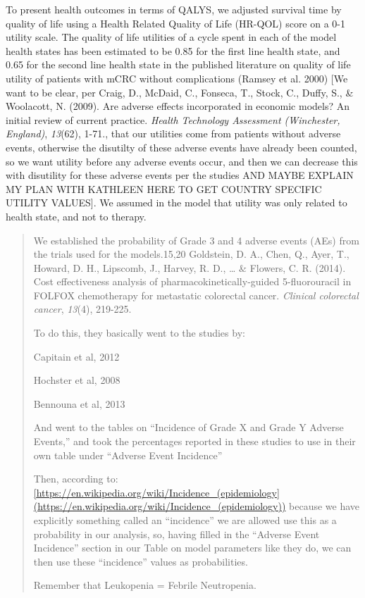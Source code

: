 \documentclass[
]{article}
\begin{document}
To present health outcomes in terms of QALYS, we adjusted survival time
by quality of life using a Health Related Quality of Life (HR-QOL) score
on a 0-1 utility scale. The quality of life utilities of a cycle spent
in each of the model health states has been estimated to be 0.85 for the
first line health state, and 0.65 for the second line health state in
the published literature on quality of life utility of patients with
mCRC without complications (Ramsey et al. 2000) {[}We want to be clear,
per Craig, D., McDaid, C., Fonseca, T., Stock, C., Duffy, S., \&
Woolacott, N. (2009). Are adverse effects incorporated in economic
models? An initial review of current practice. \emph{Health Technology
Assessment (Winchester, England)}, \emph{13}(62), 1-71., that our
utilities come from patients without adverse events, otherwise the
disutilty of these adverse events have already been counted, so we want
utility before any adverse events occur, and then we can decrease this
with disutility for these adverse events per the studies AND MAYBE
EXPLAIN MY PLAN WITH KATHLEEN HERE TO GET COUNTRY SPECIFIC UTILITY
VALUES{]}. We assumed in the model that utility was only related to
health state, and not to therapy.

\begin{quote}
We established the probability of Grade 3 and 4 adverse events (AEs)
from the trials used for the models.15,20 Goldstein, D. A., Chen, Q.,
Ayer, T., Howard, D. H., Lipscomb, J., Harvey, R. D., \ldots{} \&
Flowers, C. R. (2014). Cost effectiveness analysis of
pharmacokinetically-guided 5-fluorouracil in FOLFOX chemotherapy for
metastatic colorectal cancer. \emph{Clinical colorectal cancer},
\emph{13}(4), 219-225.

To do this, they basically went to the studies by:

Capitain et al, 2012

Hochster et al, 2008

Bennouna et al, 2013

And went to the tables on ``Incidence of Grade X and Grade Y Adverse
Events,'' and took the percentages reported in these studies to use in
their own table under ``Adverse Event Incidence''

Then, according to:
\href{https://en.wikipedia.org/wiki/Incidence_(epidemiology)}{{[}https://en.wikipedia.org/wiki/Incidence\_(epidemiology{]}(https://en.wikipedia.org/wiki/Incidence\_(epidemiology))}
because we have explicitly something called an ``incidence'' we are
allowed use this as a probability in our analysis, so, having filled in
the ``Adverse Event Incidence'' section in our Table on model parameters
like they do, we can then use these ``incidence'' values as
probabilities.

Remember that Leukopenia = Febrile Neutropenia.
\end{quote}
\end{document}
